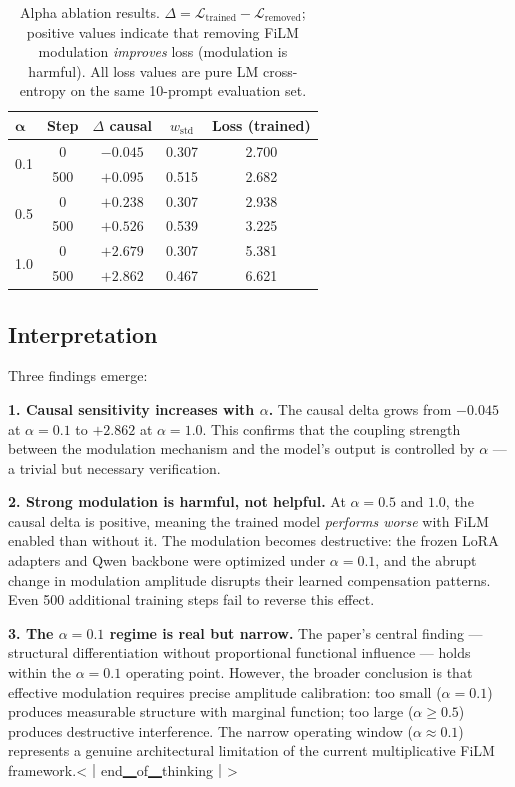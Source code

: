 \begin{table}[h]
\centering
\begin{tabular}{lcccc}
\toprule
$\boldsymbol{\alpha}$ & Step & $\Delta$ causal & $w_{\mathrm{std}}$ & Loss (trained) \\
\midrule
\multirow{2}{*}{0.1} & 0    & $-0.045$ & 0.307 & 2.700 \\
                     & 500  & $+0.095$ & 0.515 & 2.682 \\
\midrule
\multirow{2}{*}{0.5} & 0    & $+0.238$ & 0.307 & 2.938 \\
                     & 500  & $+0.526$ & 0.539 & 3.225 \\
\midrule
\multirow{2}{*}{1.0} & 0    & $+2.679$ & 0.307 & 5.381 \\
                     & 500  & $+2.862$ & 0.467 & 6.621 \\
\bottomrule
\end{tabular}
\caption{Alpha ablation results. $\Delta = \mathcal{L}_{\text{trained}} - \mathcal{L}_{\text{removed}}$;
positive values indicate that removing FiLM modulation \emph{improves} loss (modulation
is harmful). All loss values are pure LM cross-entropy on the same 10-prompt evaluation set.}
\end{table}

\subsection{Interpretation}

Three findings emerge:

\textbf{1. Causal sensitivity increases with $\alpha$.} The causal delta grows from
$-0.045$ at $\alpha=0.1$ to $+2.862$ at $\alpha=1.0$. This confirms that the
coupling strength between the modulation mechanism and the model's output is
controlled by $\alpha$ --- a trivial but necessary verification.

\textbf{2. Strong modulation is harmful, not helpful.} At $\alpha=0.5$ and $1.0$,
the causal delta is positive, meaning the trained model \emph{performs worse} with
FiLM enabled than without it. The modulation becomes destructive: the frozen LoRA
adapters and Qwen backbone were optimized under $\alpha=0.1$, and the abrupt change
in modulation amplitude disrupts their learned compensation patterns. Even 500
additional training steps fail to reverse this effect.

\textbf{3. The $\alpha=0.1$ regime is real but narrow.} The paper's central finding
--- structural differentiation without proportional functional influence --- holds
within the $\alpha=0.1$ operating point. However, the broader conclusion is that
effective modulation requires precise amplitude calibration: too small ($\alpha=0.1$)
produces measurable structure with marginal function; too large ($\alpha \geq 0.5$)
produces destructive interference. The narrow operating window ($\alpha \approx 0.1$)
represents a genuine architectural limitation of the current multiplicative FiLM
framework.<｜end▁of▁thinking｜>

